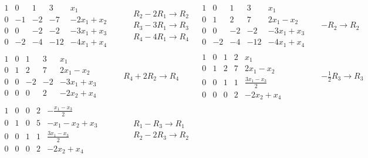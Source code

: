 \documentclass{report}
\begin{document}
\begin{align*}
	&\begin{array}{cccc|c}
		1 & 0 & 1 & 3 & x_1 \\
		0 & -1 & -2 & -7 & -2x_1 + x_2 \\
		0 & 0 & -2 & -2 & -3x_1 + x_3 \\
		0 & -2 & -4 & -12 & -4x_1 + x_4
	\end{array}
	&& \begin{aligned} & R_2 - 2R_1 \rightarrow R_2 \\ & R_3 - 3R_1 \rightarrow R_3 \\ & R_4 - 4R_1 
	\rightarrow R_4 \end{aligned}
	&\begin{array}{cccc|c}
		1 & 0 & 1 & 3 & x_1 \\
		0 & 1 & 2 & 7 & 2x_1 - x_2 \\
		0 & 0 & -2 & -2 & -3x_1 + x_3 \\
		0 & -2 & -4 & -12 & -4x_1 + x_4
	\end{array}
	&& -R_2 \rightarrow R_2 \\
	&\begin{array}{cccc|c}
		1 & 0 & 1 & 3 &  x_1 \\
		0 & 1 & 2 & 7 & 2x_1 - x_2 \\
		0 & 0 & -2 & -2 & -3x_1 + x_3 \\
		0 & 0 & 0 & 2 & -2x_2 + x_4
	\end{array}
	&& R_4 + 2R_2 \rightarrow R_4
	&\begin{array}{cccc|c}
		1 & 0 & 1 & 2 &  x_1 \\
		0 & 1 & 2 & 7 & 2x_1 - x_2 \\
		0 & 0 & 1 & 1 & \frac{3x_1 - x_3}{2} \\
		0 & 0 & 0 & 2 & -2x_2 + x_4
	\end{array}
	&& -\frac{1}{2}R_3 \rightarrow R_3 \\
	&\begin{array}{cccc|c}
		1 & 0 & 0 & 2 &  -\frac{x_1 -x_3}{2}\\
		0 & 1 & 0 & 5 & -x_1-x_2+x_3\\
		0 & 0 & 1 & 1 & \frac{3x_1 - x_3}{2} \\
		0 & 0 & 0 & 2 & -2x_2 + x_4
	\end{array}
	&& \begin{aligned} & R_1 - R_3 \rightarrow R_1 \\ & R_2 - 2R_3 \rightarrow R_2\end{aligned}
	&\begin{array}{cccc|c}

\end{array}
\end{align*}
\end{document}
